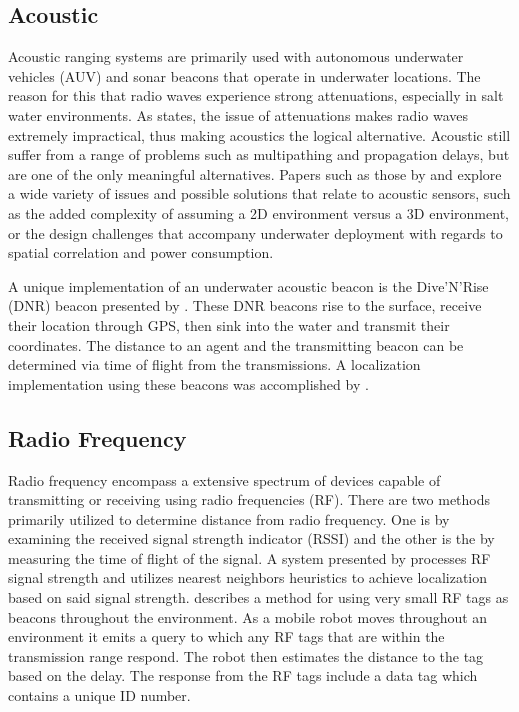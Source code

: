 \documentclass[conference]{IEEEtran}
\begin{document}
		\subsection{Acoustic}
	
			Acoustic ranging systems are primarily used with autonomous underwater vehicles (AUV) and sonar beacons that operate in underwater locations. The reason for this that radio waves experience strong attenuations, especially in salt water environments. As \cite{Partan2007} states, the issue of attenuations makes radio waves extremely impractical, thus making acoustics the logical alternative. Acoustic still suffer from a range of problems such as multipathing and propagation delays, but are one of the only meaningful alternatives. Papers such as those by \cite{Erol-Kantarci2011} and \cite{Akyildiz2005} explore a wide variety of issues and possible solutions that relate to acoustic sensors, such as the added complexity of assuming a 2D environment versus a 3D environment, or the design challenges that accompany underwater deployment with regards to spatial correlation and power consumption. 
		  	
			A unique implementation of an underwater acoustic beacon is the Dive'N'Rise (DNR) beacon presented by \cite{Erol2007}. These DNR beacons rise to the surface, receive their location through GPS, then sink into the water and transmit their coordinates. The distance to an agent and the transmitting beacon can be determined via time of flight from the transmissions. A localization implementation using these beacons was accomplished by \cite{Erol2008}. 
	

		\subsection{Radio Frequency}
			
			Radio frequency encompass a extensive spectrum of devices capable of transmitting or receiving using radio frequencies (RF). There are two methods primarily utilized to determine distance from radio frequency. One is by examining the received signal strength indicator (RSSI) and the other is the by measuring the time of flight of the signal. A system presented by \cite{Padmanabhan2000} processes RF signal strength and utilizes nearest neighbors heuristics to achieve localization based on said signal strength.  \cite{Kurth2003a} describes a method for using very small RF tags as beacons throughout the environment.  As a mobile robot moves throughout an environment it emits a query to which any RF tags that are within the transmission range respond. The robot then estimates the distance to the tag based on the delay. The response from the RF tags include a data tag which contains a unique ID number. 
						
\end{document}

